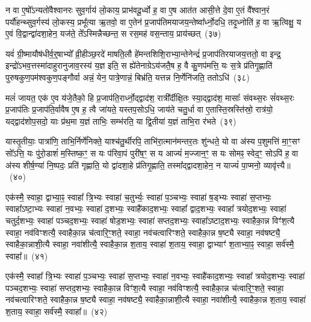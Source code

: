 न वा ए॒षो᳚\-ऽन्यतो॑वैश्वानरः सुव॒र्गाय॑ लो॒काय॒ प्राभ॑वदू॒र्ध्वो ह॒ वा ए॒ष आत॑त आसी॒त्ते दे॒वा ए॒तं वै᳚श्वान॒रं पर्यौ॑हन्थ्सुव॒र्गस्य॑ लो॒कस्य॒ प्रभू᳚त्या ऋ॒तवो॒ वा ए॒तेन॑ प्र॒जा\-प॑तिमयाजय॒न्तेष्वा᳚र्ध्नो॒दधि॒ तदृ॒ध्नोति॑ ह॒ वा ऋ॒त्विक्षु॒ य ए॒वं वि॒द्वान्द्वा॑दशा॒हेन॒ यज॑ते॒ ते᳚\-ऽस्मिन्नैच्छन्त॒ स रस॒मह॑ वस॒न्ताय॒ प्राय॑च्छत्~(३७)

यवं॑ ग्री॒ष्मायौष॑धीर्व॒र्॒\mbox{}षाभ्यो᳚ व्री॒हीञ्छ॒रदे॑ माषति॒लौ हे॑मन्तशिशि॒राभ्या॒न्तेनेन्द्रं॑ प्र॒जा\-प॑तिरयाजय॒त्ततो॒ वा इन्द्र॒ इन्द्रो॑\-ऽभव॒त्तस्मा॑दाहुरानुजाव॒रस्य॑ य॒ज्ञ इति॒ स ह्ये॑तेनाग्रे\-ऽय॑जतै॒ष ह॒ वै कु॒णप॑मत्ति॒ यः स॒त्रे प्र॑तिगृ॒ह्णाति॑ पुरुषकुण॒पम॑श्वकुण॒पङ्गौर्वा अन्नं॒ येन॒ पात्रे॒णान्नं॒ बिभ्र॑ति॒ यत्तन्न नि॒र्णेनि॑जति॒ ततो\-ऽधि॑~(३८)

मलं॑ जायत॒ एक॑ ए॒व य॑जे॒तैको॒ हि प्र॒जा\-प॑ति॒रार्ध्नो॒द्द्वाद॑श॒ रात्री᳚र्दीक्षि॒तः स्या॒द्द्वाद॑श॒ मासाः᳚ संवथ्स॒रः सं॑वथ्स॒रः प्र॒जा\-प॑तिः प्र॒जा\-प॑ति॒र्वावैष ए॒ष ह॒ त्वै जा॑यते॒ यस्तप॒सो\-ऽधि॒ जाय॑ते चतु॒र्धा वा ए॒तास्ति॒स्रस्ति॑स्रो॒ रात्र॑यो॒ यद्द्वाद॑शोप॒सदो॒ याः प्र॑थ॒मा य॒ज्ञं ताभिः॒ सम्भ॑रति॒ या द्वि॒तीया॑ य॒ज्ञं ताभि॒रा र॑भते~(३९)

यास्तृ॒तीयाः॒ पात्रा॑णि॒ ताभि॒र्निर्णे॑निक्ते॒ याश्च॑तु॒र्थीरपि॒ ताभि॑रा॒त्मान॑मन्तर॒तः शु॑न्धते॒ यो वा अ॑स्य प॒शुमत्ति॑ मा॒ꣳ॒सꣳ सो᳚\-ऽत्ति॒ यः पु॑रो॒डाशं॑ म॒स्तिष्क॒ꣳ॒ स यः प॑रिवा॒पं पुरी॑ष॒ꣳ॒ स य आज्यं॑ म॒ज्जान॒ꣳ॒ स यः सोमꣴ॒ स्वेद॒ꣳ॒ सो\-ऽपि॑ ह॒ वा अ॑स्य शीर्\mbox{}ष॒ण्या॑ नि॒ष्पदः॒ प्रति॑ गृह्णाति॒ यो द्वा॑दशा॒हे प्र॑तिगृ॒ह्णाति॒ तस्मा᳚द्द्वादशा॒हेन॒ न याज्यं॑ पा॒प्मनो॒ व्यावृ॑त्त्यै॥~(४०)

{\anuvakamend[{अय॑च्छ॒दधि॑ रभते द्वादशा॒हेन॑ च॒त्वारि॑ च}]}%

एक॑स्मै॒ स्वाहा॒ द्वाभ्या॒ꣴ॒ स्वाहा᳚ त्रि॒भ्यः स्वाहा॑ च॒तुर्भ्यः॒ स्वाहा॑ प॒ञ्चभ्यः॒ स्वाहा॑ ष॒ड्भ्यः स्वाहा॑ स॒प्तभ्यः॒ स्वाहा᳚\-ऽष्टा॒भ्यः स्वाहा॑ न॒वभ्यः॒ स्वाहा॑ द॒शभ्यः॒ स्वाहै॑काद॒शभ्यः॒ स्वाहा᳚ द्वाद॒शभ्यः॒ स्वाहा᳚ त्रयोद॒शभ्यः॒ स्वाहा॑ चतुर्द॒शभ्यः॒ स्वाहा॑ पञ्चद॒शभ्यः॒ स्वाहा॑ षोड॒शभ्यः॒ स्वाहा॑ सप्तद॒शभ्यः॒ स्वाहा᳚\-ऽष्टाद॒शभ्यः॒ स्वाहैका॒न्न विꣳ॑श॒त्यै स्वाहा॒ नव॑विꣳशत्यै॒ स्वाहैका॒न्न च॑त्वारि॒ꣳ॒शते॒ स्वाहा॒ नव॑चत्वारिꣳशते॒ स्वाहैका॒न्न ष॒ष्ट्यै स्वाहा॒ नव॑षष्ट्यै॒ स्वाहैका॒न्नाशी॒त्यै स्वाहा॒ नवा॑शीत्यै॒ स्वाहैका॒न्न श॒ताय॒ स्वाहा॑ श॒ताय॒ स्वाहा॒ द्वाभ्याꣳ॑ श॒ताभ्या॒ꣴ॒ स्वाहा॒ सर्व॑स्मै॒ स्वाहा᳚॥~(४१)

{}%

एक॑स्मै॒ स्वाहा᳚ त्रि॒भ्यः स्वाहा॑ प॒ञ्चभ्यः॒ स्वाहा॑ स॒प्तभ्यः॒ स्वाहा॑ न॒वभ्यः॒ स्वाहै॑काद॒शभ्यः॒ स्वाहा᳚ त्रयोद॒शभ्यः॒ स्वाहा॑ पञ्चद॒शभ्यः॒ स्वाहा॑ सप्तद॒शभ्यः॒ स्वाहैका॒न्न विꣳ॑श॒त्यै स्वाहा॒ नव॑विꣳशत्यै॒ स्वाहैका॒न्न च॑त्वारि॒ꣳ॒शते॒ स्वाहा॒ नव॑चत्वारिꣳशते॒ स्वाहैका॒न्न ष॒ष्ट्यै स्वाहा॒ नव॑षष्ट्यै॒ स्वाहैका॒न्नाशी॒त्यै स्वाहा॒ नवा॑शीत्यै॒ स्वाहैका॒न्न श॒ताय॒ स्वाहा॑ श॒ताय॒ स्वाहा॒ सर्व॑स्मै॒ स्वाहा᳚॥~(४२)


